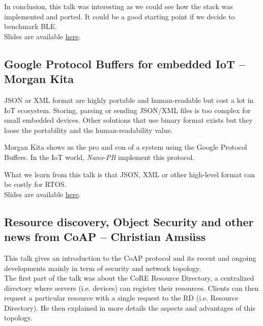 \documentclass[journal, a4paper]{../IEEEtran}
\begin{document}
In conclusion, this talk was interesting as we could see how the stack was implemented and ported.
It could be a good starting point if we decide to benchmark BLE. \\


Slides are available \href{http://summit.riot-os.org/2018/wp-content/uploads/sites/10/2018/09/1_1-Szymon-Janc-NimBLE.pdf}{here}.

\subsection{Google Protocol Buffers for embedded IoT -- Morgan Kita}

JSON or XML format are highly portable and human-readable but cost a lot in IoT ecosystem. 
Storing, parsing or sending JSON/XML files is too complex for small embedded devices. 
Other solutions that use binary format exists but they loose the portability and the human-readability value.

Morgan Kita shows us the pro and con of a system using the Google Protocol Buffers.
In the IoT world, \textit{Nano-PB} implement this protocol.

What we learn from this talk is that JSON, XML or other high-level format can be costly for RTOS. \\

Slides are available \href{http://summit.riot-os.org/2018/wp-content/uploads/sites/10/2018/09/1_2-Kita-Morgan-Protobuf.pdf}{here}.

\subsection{Resource discovery, Object Security and other news from CoAP -- Christian Amsüss}
This talk gives an introduction to the CoAP protocol and its recent and ongoing developments mainly in term of security and network topology.\\

The first part of the talk was about the CoRE Resource Directory, a centralized directory where servers (i.e. devices) can register their resources.
Clients can then request a particular resource with a single request to the RD (i.e. Resource Directory).
He then explained in more details the aspects and advantages of this topology.\\
\end{document}
